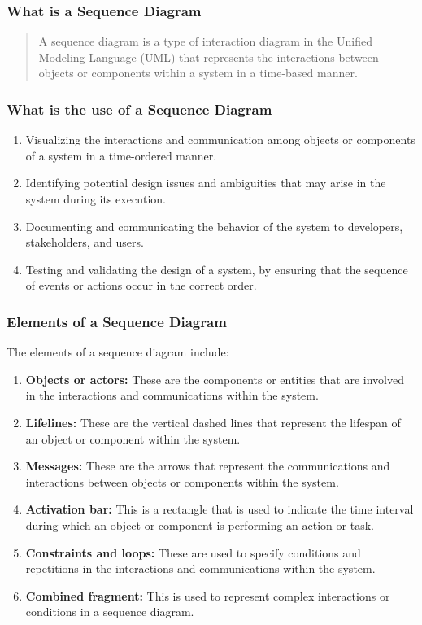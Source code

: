 \documentclass[11pt]{article}
\begin{document}
\subsubsection{What is a Sequence Diagram}

\begin{quotation}
	A sequence diagram is a type of interaction diagram in the Unified Modeling Language (UML) that represents the interactions between objects or components within a system in a time-based manner.
\end{quotation}

\subsubsection{What is the use of a Sequence Diagram}
\begin{enumerate}
	\item Visualizing the interactions and communication among objects or components of a system in a time-ordered manner.
	\item Identifying potential design issues and ambiguities that may arise in the system during its execution.
	\item Documenting and communicating the behavior of the system to developers, stakeholders, and users.
	\item Testing and validating the design of a system, by ensuring that the sequence of events or actions occur in the correct order.
\end{enumerate}
\subsubsection{Elements of a Sequence Diagram}

The elements of a sequence diagram include:
\begin{enumerate}
	\item \textbf{Objects or actors:} These are the components or entities that are involved in the interactions and communications within the system.
	\item \textbf{Lifelines:} These are the vertical dashed lines that represent the lifespan of an object or component within the system.
	\item \textbf{Messages:} These are the arrows that represent the communications and interactions between objects or components within the system.
	\item \textbf{Activation bar:} This is a rectangle that is used to indicate the time interval during which an object or component is performing an action or task.
	\item \textbf{Constraints and loops:} These are used to specify conditions and repetitions in the interactions and communications within the system.
	\item \textbf{Combined fragment:} This is used to represent complex interactions or conditions in a sequence diagram.
\end{enumerate}
\end{document}
